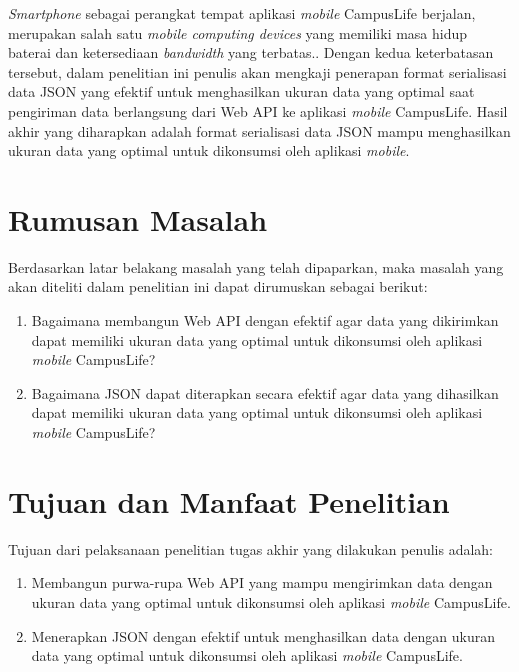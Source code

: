 \documentclass[a4paper, 12pt]{report}
\begin{document}
\onehalfspacing \textit{Smartphone} sebagai perangkat tempat aplikasi \textit{mobile} CampusLife berjalan, merupakan salah satu \textit{mobile computing devices} yang memiliki masa hidup baterai dan ketersediaan \textit{bandwidth} yang terbatas.\cite{challenging-issues-and-limitations-of-mobile-computing}. Dengan kedua keterbatasan tersebut, dalam penelitian ini penulis akan mengkaji penerapan format serialisasi data JSON yang efektif untuk menghasilkan ukuran data yang optimal saat pengiriman data berlangsung dari Web API ke aplikasi \textit{mobile} CampusLife. Hasil akhir yang diharapkan adalah format serialisasi data JSON mampu menghasilkan ukuran data yang optimal untuk dikonsumsi oleh aplikasi \textit{mobile}.

\newpage
\section{Rumusan Masalah}
\onehalfspacing Berdasarkan latar belakang masalah yang telah dipaparkan, maka masalah yang akan diteliti dalam penelitian ini dapat dirumuskan sebagai berikut:
\begin{enumerate}
  \item Bagaimana membangun Web API dengan efektif agar data yang dikirimkan dapat memiliki ukuran data yang optimal untuk dikonsumsi oleh aplikasi \textit{mobile} CampusLife?
  \item Bagaimana JSON dapat diterapkan secara efektif agar data yang dihasilkan dapat memiliki ukuran data yang optimal untuk dikonsumsi oleh aplikasi \textit{mobile} CampusLife?
\end{enumerate}

\section{Tujuan dan Manfaat Penelitian}
\onehalfspacing Tujuan dari pelaksanaan penelitian tugas akhir yang dilakukan penulis adalah:
\begin{enumerate}
  \item Membangun purwa-rupa Web API yang mampu mengirimkan data dengan ukuran data yang optimal untuk dikonsumsi oleh aplikasi \textit{mobile} CampusLife.
  \item Menerapkan JSON dengan efektif untuk menghasilkan data dengan ukuran data yang optimal untuk dikonsumsi oleh aplikasi \textit{mobile} CampusLife.
\end{enumerate}
\end{document}
